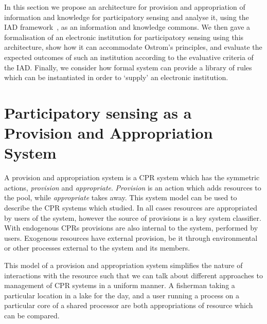 In this section we propose an architecture for provision and appropriation of information and knowledge for participatory sensing and analyse it, using the \ac{IAD} framework~\citep{Ostrom2005}, as an information and knowledge commons.
We then gave a formalisation of an electronic institution for participatory sensing using this architecture, show how it can accommodate Ostrom's principles,
and evaluate the expected outcomes of such an institution according to the evaluative criteria of the \ac{IAD}.
Finally, we consider how formal system can provide a library of rules which can be instantiated in order to `supply' an electronic institution. 


\section{Participatory sensing as a Provision and Appropriation System}

A provision and appropriation system is a \ac{CPR} system which has the
symmetric actions, \emph{provision} and \emph{appropriate}. \emph{Provision}
is an action which adds resources to the pool, while \emph{appropriate} takes
away. This system model can be used to describe the \ac{CPR} systems which
\citet{Ostrom1990} studied. In all cases resources are appropriated by users
of the system, however the source of provisions is a key system classifier.
With endogenous \acp{CPR} provisions are also internal to the system,
performed by users. Exogenous resources have external provision, be it through
environmental or other processes external to the system and its members.

This model of a provision and appropriation system simplifies the nature of
interactions with the resource such that we can talk about different
approaches to management of \ac{CPR} systems in a uniform manner. A fisherman
taking a particular location in a lake for the day, and a user running a
process on a particular core of a shared processor are both appropriations of
resource which can be compared.

